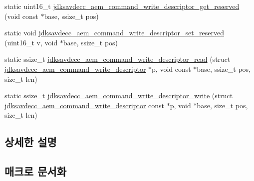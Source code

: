 \begin{DoxyCompactItemize}
\item 
static uint16\+\_\+t \hyperlink{group__command__write__descriptor_ga6c3320a31f0e9a287eb341efdb0d0ccb}{jdksavdecc\+\_\+aem\+\_\+command\+\_\+write\+\_\+descriptor\+\_\+get\+\_\+reserved} (void const $\ast$base, ssize\+\_\+t pos)
\item 
static void \hyperlink{group__command__write__descriptor_ga6514b188ff90af7a2bfc991da10bd385}{jdksavdecc\+\_\+aem\+\_\+command\+\_\+write\+\_\+descriptor\+\_\+set\+\_\+reserved} (uint16\+\_\+t v, void $\ast$base, ssize\+\_\+t pos)
\item 
static ssize\+\_\+t \hyperlink{group__command__write__descriptor_gaf771dee27bfda332ea057726ff3d5e8f}{jdksavdecc\+\_\+aem\+\_\+command\+\_\+write\+\_\+descriptor\+\_\+read} (struct \hyperlink{structjdksavdecc__aem__command__write__descriptor}{jdksavdecc\+\_\+aem\+\_\+command\+\_\+write\+\_\+descriptor} $\ast$p, void const $\ast$base, ssize\+\_\+t pos, size\+\_\+t len)
\item 
static ssize\+\_\+t \hyperlink{group__command__write__descriptor_ga20bbb90a439bff4c011be9f8c6211d47}{jdksavdecc\+\_\+aem\+\_\+command\+\_\+write\+\_\+descriptor\+\_\+write} (struct \hyperlink{structjdksavdecc__aem__command__write__descriptor}{jdksavdecc\+\_\+aem\+\_\+command\+\_\+write\+\_\+descriptor} const $\ast$p, void $\ast$base, size\+\_\+t pos, size\+\_\+t len)
\end{DoxyCompactItemize}


\subsection{상세한 설명}


\subsection{매크로 문서화}
